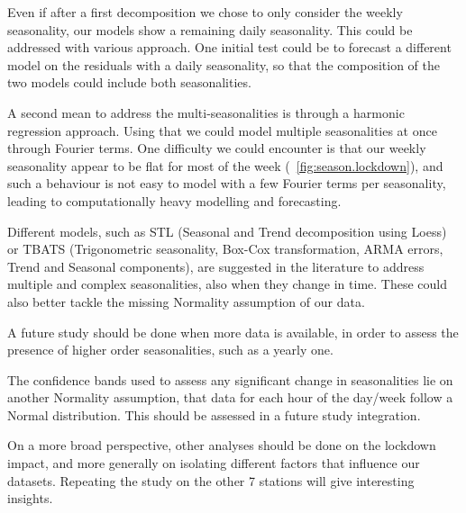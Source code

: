 \documentclass[12pt]{article}
\begin{document}
Even if after a first decomposition we chose to only consider the weekly seasonality, our models show a remaining daily seasonality. This could be addressed with various approach. One initial test could be to forecast a different model on the residuals with a daily seasonality, so that the composition of the two models could include both seasonalities.

A second mean to address the multi-seasonalities is through a harmonic regression approach. Using that we could model multiple seasonalities at once through Fourier terms. One difficulty we could encounter is that our weekly seasonality appear to be flat for most of the week (\figurename~\ref{fig:season.lockdown}), and such a behaviour is not easy to model with a few Fourier terms per seasonality, leading to computationally heavy modelling and forecasting.

Different models, such as STL (Seasonal and Trend decomposition using Loess) or TBATS (Trigonometric seasonality, Box-Cox transformation, ARMA errors, Trend and Seasonal components), are suggested in the literature \cite[chapter 12]{hyndman2018forecasting} to address multiple and complex seasonalities, also when they change in time. These could also better tackle the missing Normality assumption of our data.

A future study should be done when more data is available, in order to assess the presence of higher order seasonalities, such as a yearly one.

The confidence bands used to assess any significant change in seasonalities lie on another Normality assumption, that data for each hour of the day/week follow a Normal distribution. This should be assessed in a future study integration.

On a more broad perspective, other analyses should be done on the lockdown impact, and more generally on isolating different factors that influence our datasets. Repeating the study on the other 7 stations will give interesting insights.


\end{document}
